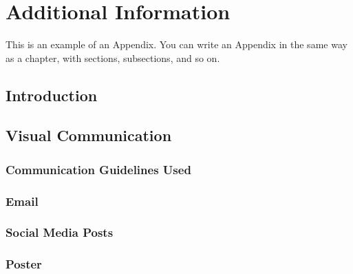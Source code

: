 
\chapter{Additional Information}
This is an example of an Appendix. You can write an Appendix in the same way as a chapter, with sections, subsections, and so on.

\section{Introduction}

\section{Visual Communication}
\subsection{Communication Guidelines Used}

\subsection{Email}

\subsection{Social Media Posts}

\subsection{Poster}

